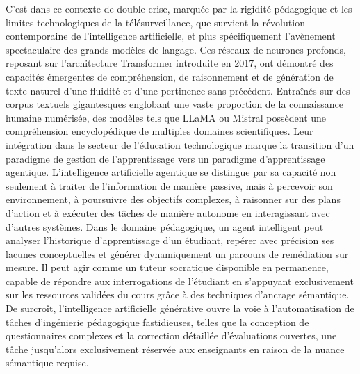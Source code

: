 C'est dans ce contexte de double crise, marquée par la rigidité pédagogique et les limites technologiques de la télésurveillance, que survient la révolution contemporaine de l'intelligence artificielle, et plus spécifiquement l'avènement spectaculaire des grands modèles de langage. Ces réseaux de neurones profonds, reposant sur l'architecture Transformer introduite en 2017, ont démontré des capacités émergentes de compréhension, de raisonnement et de génération de texte naturel d'une fluidité et d'une pertinence sans précédent. Entraînés sur des corpus textuels gigantesques englobant une vaste proportion de la connaissance humaine numérisée, des modèles tels que LLaMA ou Mistral possèdent une compréhension encyclopédique de multiples domaines scientifiques. Leur intégration dans le secteur de l'éducation technologique marque la transition d'un paradigme de gestion de l'apprentissage vers un paradigme d'apprentissage agentique. L'intelligence artificielle agentique se distingue par sa capacité non seulement à traiter de l'information de manière passive, mais à percevoir son environnement, à poursuivre des objectifs complexes, à raisonner sur des plans d'action et à exécuter des tâches de manière autonome en interagissant avec d'autres systèmes. Dans le domaine pédagogique, un agent intelligent peut analyser l'historique d'apprentissage d'un étudiant, repérer avec précision ses lacunes conceptuelles et générer dynamiquement un parcours de remédiation sur mesure. Il peut agir comme un tuteur socratique disponible en permanence, capable de répondre aux interrogations de l'étudiant en s'appuyant exclusivement sur les ressources validées du cours grâce à des techniques d'ancrage sémantique. De surcroît, l'intelligence artificielle générative ouvre la voie à l'automatisation de tâches d'ingénierie pédagogique fastidieuses, telles que la conception de questionnaires complexes et la correction détaillée d'évaluations ouvertes, une tâche jusqu'alors exclusivement réservée aux enseignants en raison de la nuance sémantique requise.

